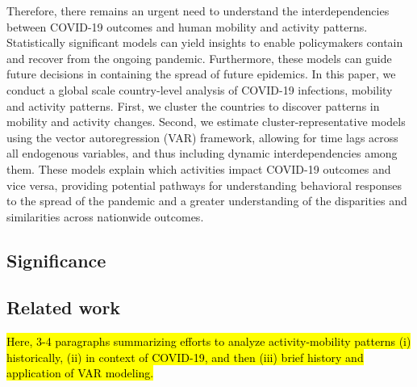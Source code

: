 \documentclass[preprint, 12pt]{elsarticle}
\newcommand{\?}{\stackrel{?}{=}}
\begin{document}
Therefore, there remains an urgent need to understand the interdependencies between COVID-19 outcomes and human mobility and activity patterns.
Statistically significant models can yield insights to enable policymakers contain and recover from the ongoing pandemic.
Furthermore, these models can guide future decisions in containing the spread of future epidemics.
In this paper, we conduct a global scale country-level analysis of COVID-19 infections,  mobility and activity patterns.
First, we cluster the countries to discover patterns in mobility and activity changes.
Second, we estimate cluster-representative models using the vector autoregression (VAR) framework, allowing for time lags across all endogenous variables, and thus including dynamic interdependencies among them.
These models explain which activities impact COVID-19 outcomes and vice versa, providing potential pathways for understanding behavioral responses to the spread of the pandemic and a greater understanding of the disparities and similarities across nationwide outcomes.

\subsection{Significance}


\subsection{Related work}
\hl{Here, 3-4 paragraphs summarizing efforts to analyze activity-mobility patterns (i) historically, (ii) in context of COVID-19, and then (iii) brief history and application of VAR modeling.} 
\end{document}
